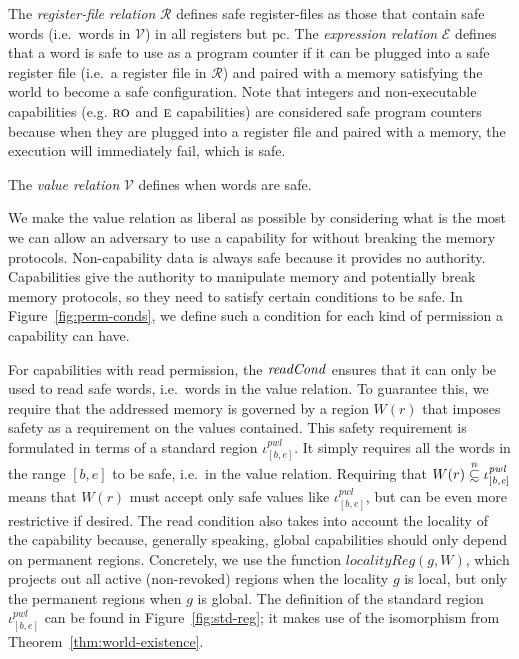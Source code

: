 \documentclass[format=acmsmall, review=true, screen=true]{acmart}
\renewcommand{\figurename}{Figure}
\newcommand\subsetsim{\mathrel{\ooalign{\raise.2ex\hbox{$\subset$}\cr
      \hidewidth\lower.8ex\hbox{\scalebox{0.9}{$\sim$}}\hidewidth\cr}}}
\newcommand{\nsubsim}[1][n]{\stackrel{\tiny{#1}}{\subsetsim}}
\newcommand{\var}[1]{\mathit{#1}}
\newcommand{\gl}{\var{g}}
\newcommand{\pcreg}{\mathrm{pc}}
\newcommand{\start}{\var{b}}
\newcommand{\addrend}{\var{e}}
\newcommand{\pwl}{\var{pwl}}
\newcommand{\plainfun}[2]{
  \ifthenelse{\equal{#2}{}}
  {\mathit{#1}}
  {\mathit{#1}(#2)}
}
\newcommand{\readCond}[1]{\plainfun{readCond}{#1}}
\newcommand{\asmType}{\plaindom{AsmType}}
\newcommand{\plaindom}[1]{\mathrm{#1}}
\newcommand{\UPred}[1]{\plaindom{UPred}(#1)}
\newcommand{\intr}[2]{\mathcal{#1}}
\newcommand{\valueintr}[1]{\intr{V}{#1}}
\newcommand{\exprintr}[1]{\intr{E}{#1}}
\newcommand{\regintr}[1]{\intr{R}{#1}}
\newcommand{\stdvr}{\valueintr{\asmType}}
\newcommand{\stder}{\exprintr{\asmType}}
\newcommand{\stdrr}{\regintr{\asmType}}
\newcommand{\plainperm}[1]{\textsc{#1}}
\newcommand{\readonly}{\plainperm{ro}}
\newcommand{\entry}{\plainperm{e}}
\newcommand{\itoplassug}[1]{}
\begin{document}
The \emph{register-file relation} $\stdrr$ defines safe register-files as those
that contain safe words (i.e.\ words in $\stdvr$) in all registers but $\pcreg$.
The \emph{expression relation} $\stder$ defines that a word is safe to use as a
program counter if it can be plugged into a safe register file (i.e.\ a register
file in $\stdrr$) and paired with a memory satisfying the world to become a safe
configuration. Note that integers and non-executable capabilities (e.g.
$\readonly$ and $\entry$ capabilities) are considered safe program counters
because when they are plugged into a register file and paired with a memory, the
execution will immediately fail, which is safe.

The \emph{value relation} $\stdvr$ defines when words are safe.
\itoplassug{Explain why we use $\UPred{}$ with reference to the introduction of this section.}
We make the
value relation as liberal as possible by considering what is the most we can
allow an adversary to use a capability for without breaking the memory
protocols. Non-capability data is always safe because it provides no
authority. Capabilities give the authority to manipulate memory and potentially
break memory protocols, so they need to satisfy certain conditions to be
safe. In \figurename~\ref{fig:perm-conds}, we define such a condition for each
kind of permission a capability can have.

For capabilities with read permission, the $\readCond{}$ ensures that it can
only be used to read safe words, i.e.\ words in the value relation. To guarantee
this, we require that the addressed memory is governed by a region $W(r)$ that
imposes safety as a requirement on the values contained. This safety requirement
is formulated in terms of a standard region $\iota^\pwl_{[\start,\addrend]}$. It simply
requires all the words in the range $[\start,\addrend]$ to be safe, i.e.\ in the
value relation. Requiring that $W(r)\nsubsim[n]\iota^\pwl_{[\start,\addrend]}$
means that $W(r)$ must accept only safe values like
$\iota^\pwl_{[\start,\addrend]}$, but can be even more restrictive if desired. The
read condition also takes into account the locality of the capability because,
generally speaking, global capabilities should only depend on permanent regions.
Concretely, we use the function $\var{localityReg}(\gl,W)$, which projects out
all active (non-revoked) regions when the locality $\gl$ is local, but only the
permanent regions when $\gl$ is global. The definition of the standard region
$\iota^\pwl_{[\start,\addrend]}$ can be found
in \figurename~\ref{fig:std-reg}; it makes use of the isomorphism from
Theorem~\ref{thm:world-existence}. 
\end{document}
